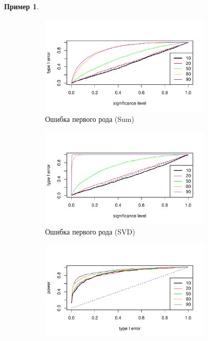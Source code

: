 \documentclass[specialist,
substylefile = spbu_report.rtx,
subf,href,colorlinks=true, 12pt]{disser}
\theoremstyle{definition}
\newtheorem{example}{Пример}
\begin{document}
\begin{example}
\begin{figure}[ht]
	\captionsetup[subfigure]{justification=Centering}
	\begin{subfigure}[t]{0.5\textwidth}
		\centering
		\includegraphics[width=0.9\textwidth]{img/type1error_sum_ev.pdf}
		\caption{Ошибка первого рода (Sum)}
		\label{fig:sum_ev_a}
	\end{subfigure}\hspace{\fill}
	\begin{subfigure}[t]{0.5\textwidth}
		\centering
		\includegraphics[width=0.9\textwidth]{img/type1error_mssa_ev.pdf}
		\caption{Ошибка первого рода (SVD)}
	\end{subfigure}
	\bigskip
	\begin{subfigure}[t]{0.5\textwidth}
		\centering
		\includegraphics[width=0.9\textwidth]{img/roc_sum_ev_omega0075.pdf}

\end{subfigure}
\end{figure}
\end{example}
\end{document}

